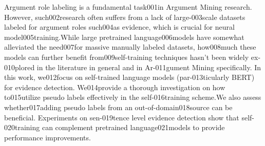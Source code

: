 Argument role labeling is a fundamental task001in Argument Mining research.  However, such002research  often  suffers  from  a  lack  of  large-003scale datasets labeled for argument roles such004as evidence, which is crucial for neural model005training.While  large  pretrained  language006models  have  somewhat  alleviated  the  need007for  massive  manually  labeled  datasets,  how008much  these  models  can  further  benefit  from009self-training techniques hasn't been widely ex-010plored  in  the  literature  in  general  and  in  Ar-011gument Mining specifically.  In this work, we012focus  on  self-trained  language  models  (par-013ticularly  BERT)  for  evidence  detection.   We014provide  a  thorough  investigation  on  how  to015utilize  pseudo  labels  effectively  in  the  self-016training  scheme.We  also  assess  whether017adding  pseudo  labels  from  an  out-of-domain018source can be beneficial.  Experiments on sen-019tence level evidence detection show that self-020training can complement pretrained language021models to provide performance improvements.
